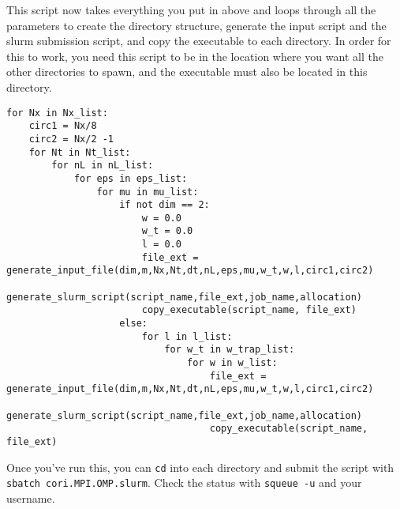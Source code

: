 \documentclass[../RotatingBosons.tex]{subfiles}
\begin{document}
This script now takes everything you put in above and loops through all the parameters to create the directory structure, generate the input script and the slurm submission script, and copy the executable to each directory. In order for this to work, you need this script to be in the location where you want all the other directories to spawn, and the executable must also be located in this directory.

\begin{lstlisting}
for Nx in Nx_list:
	circ1 = Nx/8
	circ2 = Nx/2 -1
	for Nt in Nt_list:
		for nL in nL_list:
			for eps in eps_list:
				for mu in mu_list:
					if not dim == 2:
						w = 0.0
						w_t = 0.0
						l = 0.0
						file_ext = generate_input_file(dim,m,Nx,Nt,dt,nL,eps,mu,w_t,w,l,circ1,circ2)
						generate_slurm_script(script_name,file_ext,job_name,allocation)
						copy_executable(script_name, file_ext)
					else:
						for l in l_list:
							for w_t in w_trap_list:
								for w in w_list:
									file_ext = generate_input_file(dim,m,Nx,Nt,dt,nL,eps,mu,w_t,w,l,circ1,circ2)
									generate_slurm_script(script_name,file_ext,job_name,allocation)
									copy_executable(script_name, file_ext)

\end{lstlisting}

Once you've run this, you can \lstinline{cd} into each directory and submit the script with \lstinline{sbatch cori.MPI.OMP.slurm}. Check the status with \lstinline{squeue -u} and your username.
\end{document}
